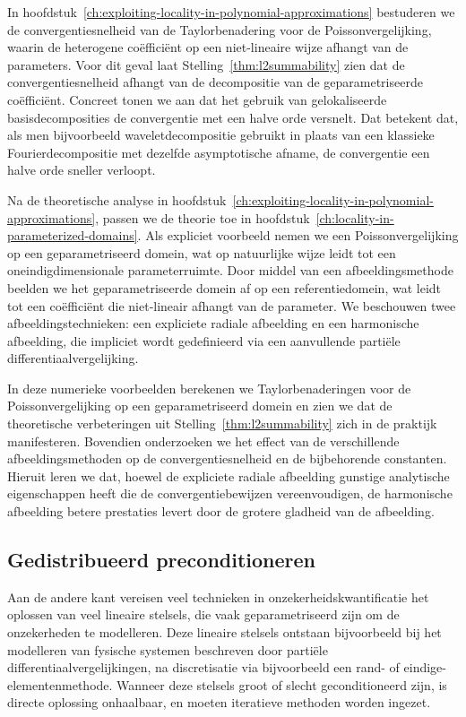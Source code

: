 In hoofdstuk~\ref{ch:exploiting-locality-in-polynomial-approximations} bestuderen we de convergentiesnelheid van de Taylorbenadering voor de Poissonvergelijking, waarin de heterogene coëfficiënt op een niet-lineaire wijze afhangt van de parameters.
Voor dit geval laat Stelling~\ref{thm:l2summability} zien dat de convergentiesnelheid afhangt van de decompositie van de geparametriseerde coëfficiënt.
Concreet tonen we aan dat het gebruik van gelokaliseerde basisdecomposities de convergentie met een halve orde versnelt.
Dat betekent dat, als men bijvoorbeeld waveletdecompositie gebruikt in plaats van een klassieke Fourierdecompositie met dezelfde asymptotische afname, de convergentie een halve orde sneller verloopt.

Na de theoretische analyse in hoofdstuk~\ref{ch:exploiting-locality-in-polynomial-approximations}, passen we de theorie toe in hoofdstuk~\ref{ch:locality-in-parameterized-domains}.
Als expliciet voorbeeld nemen we een Poissonvergelijking op een geparametriseerd domein, wat op natuurlijke wijze leidt tot een oneindigdimensionale parameterruimte.
Door middel van een afbeeldingsmethode beelden we het geparametriseerde domein af op een referentiedomein, wat leidt tot een coëfficiënt die niet-lineair afhangt van de parameter.
We beschouwen twee afbeeldingstechnieken: een expliciete radiale afbeelding en een harmonische afbeelding, die impliciet wordt gedefinieerd via een aanvullende partiële differentiaalvergelijking.

In deze numerieke voorbeelden berekenen we Taylorbenaderingen voor de Poissonvergelijking op een geparametriseerd domein en zien we dat de theoretische verbeteringen uit Stelling~\ref{thm:l2summability} zich in de praktijk manifesteren.
Bovendien onderzoeken we het effect van de verschillende afbeeldingsmethoden op de convergentiesnelheid en de bijbehorende constanten.
Hieruit leren we dat, hoewel de expliciete radiale afbeelding gunstige analytische eigenschappen heeft die de convergentiebewijzen vereenvoudigen, de harmonische afbeelding betere prestaties levert door de grotere gladheid van de afbeelding.

\subsection*{Gedistribueerd preconditioneren}\label{subsec:distributed-preconditioning_nl}
Aan de andere kant vereisen veel technieken in onzekerheidskwantificatie het oplossen van veel lineaire stelsels, die vaak geparametriseerd zijn om de onzekerheden te modelleren.
Deze lineaire stelsels ontstaan bijvoorbeeld bij het modelleren van fysische systemen beschreven door partiële differentiaalvergelijkingen, na discretisatie via bijvoorbeeld een rand- of eindige-elementenmethode.
Wanneer deze stelsels groot of slecht geconditioneerd zijn, is directe oplossing onhaalbaar, en moeten iteratieve methoden worden ingezet.

